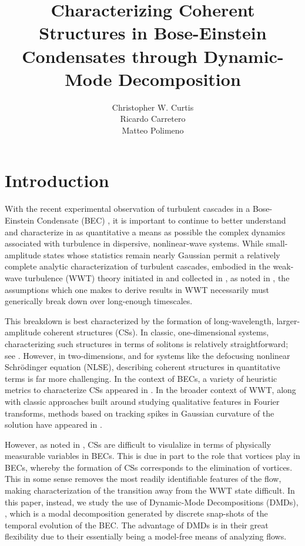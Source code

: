 \documentclass[a4paper,11pt]{article}
\author{Christopher W. Curtis \\
Ricardo Carretero\\
Matteo Polimeno}
\date{}
\title{Characterizing Coherent Structures in Bose-Einstein Condensates through Dynamic-Mode Decomposition}
\begin{document}
\maketitle
\section*{Introduction}
With the recent experimental observation of turbulent cascades in a Bose-Einstein Condensate (BEC) \cite{navon}, it is important to continue to better understand and characterize in as quantitative a means as possible the complex dynamics associated with turbulence in dispersive, nonlinear-wave systems.  While small-amplitude states whose statistics remain nearly Gaussian permit a relatively complete analytic characterization of turbulent cascades, embodied in the weak-wave turbulence (WWT) theory initiated in \cite{zakharov} and collected in \cite{nazarenko}, as noted in \cite{newell,cai}, the assumptions which one makes to derive results in WWT necessarily must generically break down over long-enough timescales.  

This breakdown is best characterized by the formation of long-wavelength, larger-amplitude coherent structures (CSs).  In classic, one-dimensional systems, characterizing such structures in terms of solitons is relatively straightforward; see \cite{cai}.  However, in two-dimensions, and for systems like the defocusing nonlinear Schr\"{o}dinger equation (NLSE), describing coherent structures in quantitative terms is far more challenging.  In the context of BECs, a variety of heuristic metrics to characterize CSs appeared in \cite{nazarenko2}.  In the broader context of WWT, along with classic approaches built around studying qualitative features in Fourier transforms, methods based on tracking spikes in Gaussian curvature of the solution have appeared in \cite{mordant}.  

However, as noted in \cite{nazarenko2}, CSs are difficult to visulalize in terms of physically measurable variables in BECs.  This is due in part to the role that vortices play in BECs, whereby the formation of CSs corresponds to the elimination of vortices.  This in some sense removes the most readily identifiable features of the flow, making characterization of the transition away from the WWT state difficult.  In this paper, instead, we study the use of Dynamic-Mode Decompositions (DMDs), \cite{schmid,williams,kutz}, which is a modal decomposition generated by discrete snap-shots of the temporal evolution of the BEC.  The advantage of DMDs is in their great flexibility due to their essentially being a model-free means of analyzing flows.  
\end{document}
